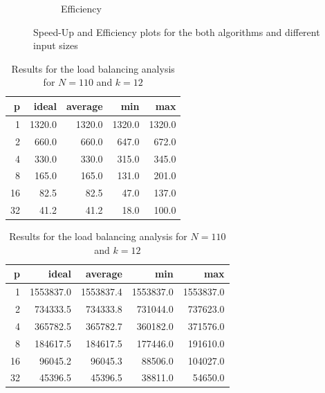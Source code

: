 \documentclass[letterpaper,twoside,11pt]{article}
\begin{document}
\begin{multicols}{2}
\begin{figure}
\begin{subfigure}{.5\textwidth}
    \caption{Efficiency}
    \label{fig:Efficiency}
  \end{subfigure}
  \caption{Speed-Up and Efficiency plots for the both algorithms and different input sizes}
\end{figure}

\begin{table}[t]
	\null\hfill
    \begin{subtable}{.45\linewidth}
        \begin{tabular}{*{5}{r}}
        \textbf{p} &  \textbf{ideal} & \textbf{average} &       \textbf{min} &       \textbf{max} \\
            \midrule
            1 &     1320.0 &    1320.0 &    1320.0 &    1320.0\\
            2 &      660.0 &     660.0 &     647.0 &     672.0\\
            4 &      330.0 &     330.0 &     315.0 &     345.0\\
            8 &      165.0 &     165.0 &     131.0 &     201.0\\
            16 &       82.5 &      82.5 &      47.0 &     137.0\\
            32 &       41.2 &      41.2 &      18.0 &     100.0\\
            
        \end{tabular}
        \caption{Load balancing of systems}
        \label{tab:Load_systems}
    \end{subtable}%
   	\hfill
    \begin{subtable}{.5\linewidth}
        \begin{tabular}{*{5}{r}}
        \textbf{p} & \textbf{ideal} & \textbf{average} &       \textbf{min} &       \textbf{max} \\
            \midrule
            1 &  1553837.0 & 1553837.4 & 1553837.0 & 1553837.0\\
            2 &   734333.5 &  734333.8 &  731044.0 &  737623.0\\
            4 &   365782.5 &  365782.7 &  360182.0 &  371576.0\\
            8 &   184617.5 &  184617.5 &  177446.0 &  191610.0\\
            16 &    96045.2 &   96045.3 &   88506.0 &  104027.0\\
            32 &    45396.5 &   45396.5 &   38811.0 &   54650.0\\
        \end{tabular}
        \caption{Load balancing of symbols}
        \label{tab:Load_symbols}
    \end{subtable}%
    \hfil\null
    \caption{Results for the load balancing analysis for $N = 110$ and $k = 12$}
    \label{tab:Load}
\end{table}


\end{multicols}
\end{document}
